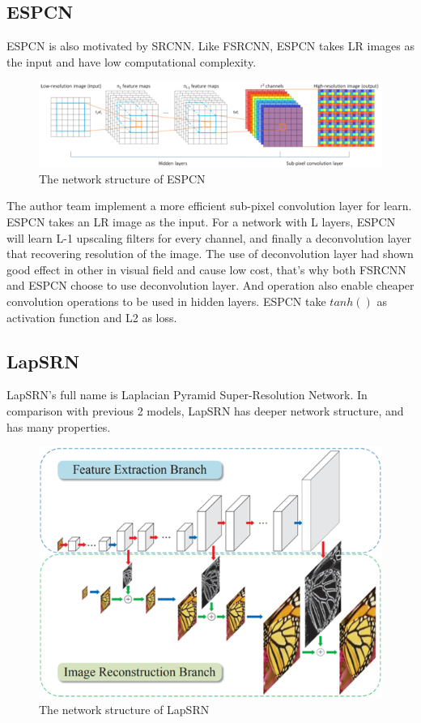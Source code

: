 \documentclass[10pt,twocolumn,letterpaper]{article}
\begin{document}
\subsection{ESPCN}
ESPCN\cite{2} is also motivated by SRCNN. Like FSRCNN, ESPCN takes LR images as the input and have low computational complexity. 
\begin{figure}[H]
    \centering
    \includegraphics[scale = 0.4]{images/ESPCN.png}
    \caption{The network structure of ESPCN}
\end{figure}
The author team implement a more efficient sub-pixel convolution layer for learn. 
ESPCN takes an LR image as the input. 
For a network with L layers, ESPCN will learn L-1 upscaling filters for every channel, and finally a deconvolution layer that recovering resolution of the image. 
The use of deconvolution layer had shown good effect in other in visual field and cause low cost, that's why both FSRCNN and ESPCN choose to use deconvolution layer. 
And operation also enable cheaper convolution operations to be used in hidden layers.
ESPCN take $tanh()$ as activation function and L2 as loss.

\subsection{LapSRN}
LapSRN's full name is Laplacian Pyramid Super-Resolution Network\cite{3}. 
In comparison with previous 2 models, LapSRN has deeper network structure, and has many properties. 
\begin{figure}[H]
    \centering
    \includegraphics[scale = 0.4]{images/LapSRN.png}
    \caption{The network structure of LapSRN}
\end{figure} 
\end{document}

